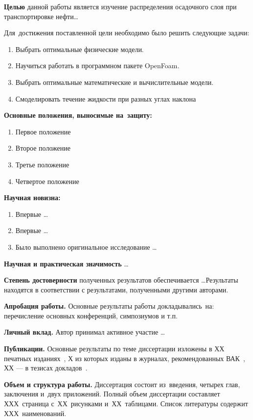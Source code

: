\textbf{Целью} данной работы является изучение распределения осадочного слоя при транспортировке нефти\ldots

Для~достижения поставленной цели необходимо было решить следующие задачи:
\begin{enumerate}
  \item Выбрать оптимальные физические модели.
  \item Научиться работать в программном пакете OpenFoam.
  \item Выбрать оптимальные математические и вычислительные модели.
  \item Смоделировать течение жидкости при разных углах наклона
\end{enumerate}

\textbf{Основные положения, выносимые на~защиту:}
\begin{enumerate}
  \item Первое положение
  \item Второе положение
  \item Третье положение
  \item Четвертое положение
\end{enumerate}

\textbf{Научная новизна:}
\begin{enumerate}
  \item Впервые \ldots
  \item Впервые \ldots
  \item Было выполнено оригинальное исследование \ldots
\end{enumerate}

\textbf{Научная и практическая значимость} \ldots

\textbf{Степень достоверности} полученных результатов обеспечивается \ldots Результаты находятся в соответствии с результатами, полученными другими авторами.

\textbf{Апробация работы.}
Основные результаты работы докладывались~на:
перечисление основных конференций, симпозиумов и т.п.

\textbf{Личный вклад.} Автор принимал активное участие \ldots

\textbf{Публикации.} Основные результаты по теме диссертации изложены в ХХ печатных изданиях~\cite{bib1,bib2,bib3,bib4,bib5},
Х из которых изданы в журналах, рекомендованных ВАК~\cite{bib1,bib2,bib3}, 
ХХ --- в тезисах докладов~\cite{bib4,bib5}.

\textbf{Объем и структура работы.} Диссертация состоит из~введения, четырех глав, заключения и~двух приложений. Полный объем диссертации составляет ХХХ~страница с~ХХ~рисунками и~ХХ~таблицами. Список литературы содержит ХХХ~наименований.

\clearpage
